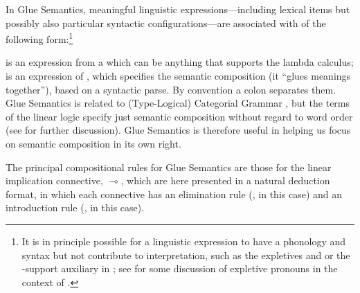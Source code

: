 In Glue Semantics, meaningful
linguistic expressions---including lexical items but possibly also
particular syntactic configurations---are associated
with  of the following form:\footnote{It is
in principle possible for a linguistic expression to have a phonology
and syntax but not contribute to interpretation, such as the expletives  and  or the -support
auxiliary in ; see \citet[113]{asudeh-lpr} for some discussion of
expletive pronouns in the context of \glue.}
\begin{exe}
\ex {}
\end{exe}
%
 is an expression from a 
which can be anything that supports the lambda calculus;  is an
expression of  \citep{girard87}, which 
specifies the semantic composition (it ``glues meanings
together''), based on a syntactic parse.  By convention a colon separates them. Glue Semantics is related to (Type-Logical) Categorial
Grammar \citep{carpenter97,morrill94a,morrill11,moortgat97}, but 
the terms of the linear logic specify just semantic
composition without regard to word order 
(see \citealt{asudeh-lpr} for further discussion). Glue Semantics is
therefore useful in helping us focus on semantic composition in its
own right.

The principal compositional rules for Glue Semantics are those for the
linear implication connective, $\multimap$, which are here presented in a
natural deduction format, in which each connective has an elimination rule (\formula{\linimpE}, in this case) and an introduction rule (\formula{\linimpI}, in this case).
%
%  
%
  
